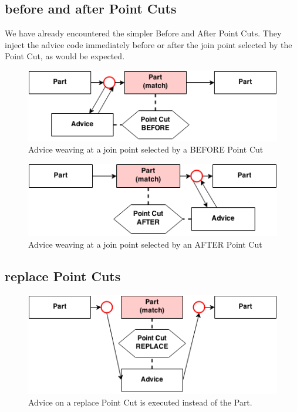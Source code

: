 \documentclass[letterpaper,10pt,english]{sphinxmanual}
\begin{document}
\subsection{before and after Point Cuts}
\label{tutorial:before-and-after-point-cuts}
We have already encountered the simpler Before and After Point Cuts. They inject the advice code
immediately before or after the join point selected by the Point Cut, as would be expected.
\begin{figure}[htbp]
\centering
\capstart

\includegraphics{point_cut_before.png}
\caption{Advice weaving at a join point selected by a BEFORE Point Cut}\end{figure}
\begin{figure}[htbp]
\centering
\capstart

\includegraphics{point_cut_after.png}
\caption{Advice weaving at a join point selected by an AFTER Point Cut}\end{figure}


\subsection{replace Point Cuts}
\label{tutorial:replace-point-cuts}\begin{figure}[htbp]
\centering
\capstart

\includegraphics{point_cut_replace.png}
\caption{Advice on a replace Point Cut is executed instead of the Part.}\end{figure}
\end{document}
